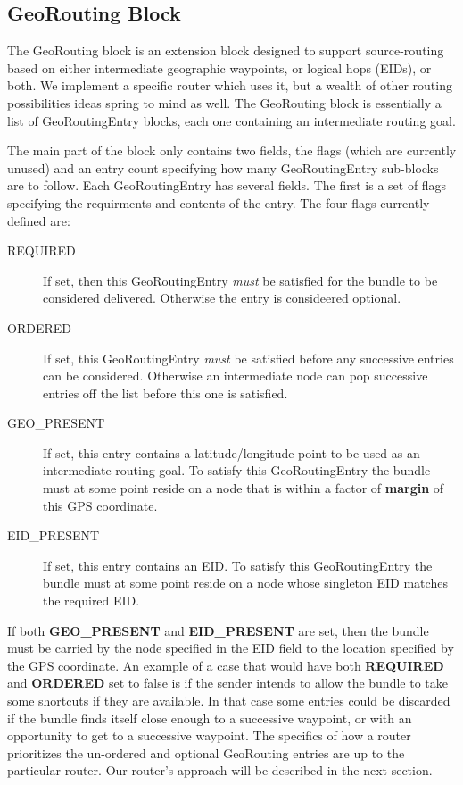 \subsection{GeoRouting Block}

The GeoRouting block is an extension block designed to support source-routing based on either intermediate geographic waypoints, or logical hops (EIDs), or both.  We implement a specific router which uses it, but a wealth of other routing possibilities ideas spring to mind as well.  The GeoRouting block is essentially a list of GeoRoutingEntry blocks, each one containing an intermediate routing goal.

The main part of the block only contains two fields, the flags (which are currently unused) and an entry count specifying how many GeoRoutingEntry sub-blocks are to follow.  Each GeoRoutingEntry has several fields.  The first is a set of flags specifying the requirments and contents of the entry.  The four flags currently defined are:
\begin{description}
  \item[REQUIRED] If set, then this GeoRoutingEntry {\it must} be satisfied for the bundle to be considered delivered.  Otherwise the entry is consideered optional.
  \item[ORDERED] If set, this GeoRoutingEntry {\it must} be satisfied before any successive entries can be considered.  Otherwise an intermediate node can pop successive entries off the list before this one is satisfied.
  \item[GEO\_PRESENT] If set, this entry contains a latitude/longitude point to be used as an intermediate routing goal.  To satisfy this GeoRoutingEntry the bundle must at some point reside on a node that is within a factor of {\bf margin} of this GPS coordinate.
  \item[EID\_PRESENT] If set, this entry contains an EID.  To satisfy this GeoRoutingEntry the bundle must at some point reside on a node whose singleton EID matches the required EID.
\end{description}

If both {\bf GEO\_PRESENT} and {\bf EID\_PRESENT} are set, then the bundle must be carried by the node specified in the EID field to the location specified by the GPS coordinate.
An example of a case that would have both {\bf REQUIRED} and {\bf ORDERED} set to false is if the sender intends to allow the bundle to take some shortcuts if they are available.  In that case some entries could be discarded if the bundle finds itself close enough to a successive waypoint, or with an opportunity to get to a successive waypoint.  The specifics of how a router prioritizes the un-ordered and optional GeoRouting entries are up to the particular router.  Our router's approach will be described in the next section.

